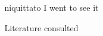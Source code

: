 \documentclass[12pt]{beamer}
\newcommand{\nah}[1]{\textcolor{nahgrn}{#1}}
\newcommand{\trs}[1]{\textcolor{nahblu}{#1}}
\begin{document}
\begin{frame}
\begin{columns}[t]
\begin{column}{.18\linewidth}
    \end{column}
    \begin{column}{.18\linewidth}
      \begin{example}
        \nah{niquittato} \trs{I went to see it}

      \end{example}
      \begin{block}{Literature consulted}
        \nocite{lockhart_NahuatlWrittenLessons2001,andrews_ClaNahuatl03,jordan_BriefNotesNahuatl}
        \printbibliography

      \end{block}
    \end{column}
  \end{columns}
  \vfill
\end{frame}
\end{document}
